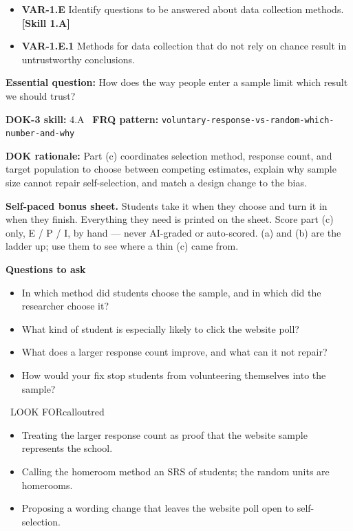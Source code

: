 \documentclass[11pt]{article}
\begin{document}


{\small
\begin{itemize}[leftmargin=1.5em,itemsep=2pt,topsep=2pt]
  \item \textbf{VAR-1.E} Identify questions to be answered about data collection methods. \textbf{[Skill 1.A]}
  \item \textbf{VAR-1.E.1} Methods for data collection that do not rely on chance result in untrustworthy conclusions.
\end{itemize}
}
\textbf{Essential question:} How does the way people enter a sample limit which result we should trust?\par
\textbf{DOK-3 skill:} 4.A \textperiodcentered\ \textbf{FRQ pattern:} {\small\texttt{voluntary-\allowbreak{}response-\allowbreak{}vs-\allowbreak{}random-\allowbreak{}which-\allowbreak{}number-\allowbreak{}and-\allowbreak{}why}}\par
\textbf{DOK rationale:} Part (c) coordinates selection method, response count, and target population to choose between competing estimates, explain why sample size cannot repair self-selection, and match a design change to the bias.\par

\textbf{Self-paced bonus sheet.} Students take it when they choose and turn it in when they finish. Everything they need is printed on the sheet. Score part (c) only, E / P / I, by hand --- never AI-graded or auto-scored. (a) and (b) are the ladder up; use them to see where a thin (c) came from.\par

\textbf{Questions to ask}
\begin{itemize}[leftmargin=1.5em,itemsep=2pt,topsep=2pt]
  \item In which method did students choose the sample, and in which did the researcher choose it?
  \item What kind of student is especially likely to click the website poll?
  \item What does a larger response count improve, and what can it not repair?
  \item How would your fix stop students from volunteering themselves into the sample?
\end{itemize}

\begin{callout}{\IconWarn\ LOOK FOR}{calloutred}
\begin{itemize}[leftmargin=1.5em,itemsep=2pt,topsep=2pt]
  \item Treating the larger response count as proof that the website sample represents the school.
  \item Calling the homeroom method an SRS of students; the random units are homerooms.
  \item Proposing a wording change that leaves the website poll open to self-selection.
\end{itemize}
\end{callout}
\end{document}
